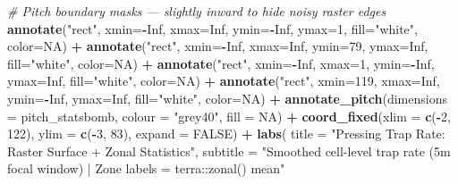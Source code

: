 \documentclass[
]{article}
\newenvironment{Shaded}{\begin{snugshade}}{\end{snugshade}}
\newcommand{\AttributeTok}[1]{\textcolor[rgb]{0.13,0.29,0.53}{#1}}
\newcommand{\CommentTok}[1]{\textcolor[rgb]{0.56,0.35,0.01}{\textit{#1}}}
\newcommand{\ConstantTok}[1]{\textcolor[rgb]{0.56,0.35,0.01}{#1}}
\newcommand{\DecValTok}[1]{\textcolor[rgb]{0.00,0.00,0.81}{#1}}
\newcommand{\FunctionTok}[1]{\textcolor[rgb]{0.13,0.29,0.53}{\textbf{#1}}}
\newcommand{\NormalTok}[1]{#1}
\newcommand{\SpecialCharTok}[1]{\textcolor[rgb]{0.81,0.36,0.00}{\textbf{#1}}}
\newcommand{\StringTok}[1]{\textcolor[rgb]{0.31,0.60,0.02}{#1}}
\begin{document}
\begin{Shaded}
\begin{Highlighting}[]
  \CommentTok{\# Pitch boundary masks — slightly inward to hide noisy raster edges}
  \FunctionTok{annotate}\NormalTok{(}\StringTok{"rect"}\NormalTok{, }\AttributeTok{xmin=}\SpecialCharTok{{-}}\ConstantTok{Inf}\NormalTok{, }\AttributeTok{xmax=}\ConstantTok{Inf}\NormalTok{,  }\AttributeTok{ymin=}\SpecialCharTok{{-}}\ConstantTok{Inf}\NormalTok{, }\AttributeTok{ymax=}\DecValTok{1}\NormalTok{,   }\AttributeTok{fill=}\StringTok{"white"}\NormalTok{, }\AttributeTok{color=}\ConstantTok{NA}\NormalTok{) }\SpecialCharTok{+}
  \FunctionTok{annotate}\NormalTok{(}\StringTok{"rect"}\NormalTok{, }\AttributeTok{xmin=}\SpecialCharTok{{-}}\ConstantTok{Inf}\NormalTok{, }\AttributeTok{xmax=}\ConstantTok{Inf}\NormalTok{,  }\AttributeTok{ymin=}\DecValTok{79}\NormalTok{,   }\AttributeTok{ymax=}\ConstantTok{Inf}\NormalTok{, }\AttributeTok{fill=}\StringTok{"white"}\NormalTok{, }\AttributeTok{color=}\ConstantTok{NA}\NormalTok{) }\SpecialCharTok{+}
  \FunctionTok{annotate}\NormalTok{(}\StringTok{"rect"}\NormalTok{, }\AttributeTok{xmin=}\SpecialCharTok{{-}}\ConstantTok{Inf}\NormalTok{, }\AttributeTok{xmax=}\DecValTok{1}\NormalTok{,    }\AttributeTok{ymin=}\SpecialCharTok{{-}}\ConstantTok{Inf}\NormalTok{, }\AttributeTok{ymax=}\ConstantTok{Inf}\NormalTok{, }\AttributeTok{fill=}\StringTok{"white"}\NormalTok{, }\AttributeTok{color=}\ConstantTok{NA}\NormalTok{) }\SpecialCharTok{+}
  \FunctionTok{annotate}\NormalTok{(}\StringTok{"rect"}\NormalTok{, }\AttributeTok{xmin=}\DecValTok{119}\NormalTok{,  }\AttributeTok{xmax=}\ConstantTok{Inf}\NormalTok{,  }\AttributeTok{ymin=}\SpecialCharTok{{-}}\ConstantTok{Inf}\NormalTok{, }\AttributeTok{ymax=}\ConstantTok{Inf}\NormalTok{, }\AttributeTok{fill=}\StringTok{"white"}\NormalTok{, }\AttributeTok{color=}\ConstantTok{NA}\NormalTok{) }\SpecialCharTok{+}
  \FunctionTok{annotate\_pitch}\NormalTok{(}\AttributeTok{dimensions =}\NormalTok{ pitch\_statsbomb, }\AttributeTok{colour =} \StringTok{"grey40"}\NormalTok{, }\AttributeTok{fill =} \ConstantTok{NA}\NormalTok{) }\SpecialCharTok{+}
  \FunctionTok{coord\_fixed}\NormalTok{(}\AttributeTok{xlim =} \FunctionTok{c}\NormalTok{(}\SpecialCharTok{{-}}\DecValTok{2}\NormalTok{, }\DecValTok{122}\NormalTok{), }\AttributeTok{ylim =} \FunctionTok{c}\NormalTok{(}\SpecialCharTok{{-}}\DecValTok{3}\NormalTok{, }\DecValTok{83}\NormalTok{), }\AttributeTok{expand =} \ConstantTok{FALSE}\NormalTok{) }\SpecialCharTok{+}
  \FunctionTok{labs}\NormalTok{(}
    \AttributeTok{title    =} \StringTok{"Pressing Trap Rate: Raster Surface + Zonal Statistics"}\NormalTok{,}
    \AttributeTok{subtitle =} \StringTok{"Smoothed cell{-}level trap rate (5m focal window) | Zone labels = terra::zonal() mean"}

\end{Highlighting}
\end{Shaded}
\end{document}
